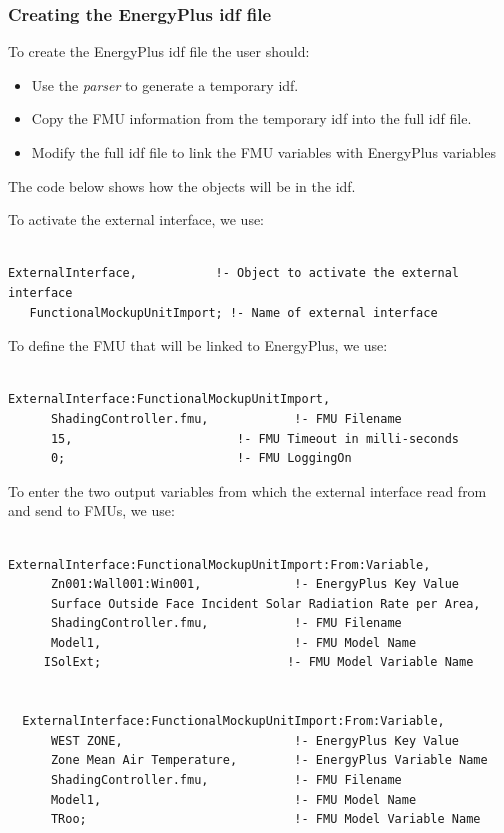 \subsubsection{Creating the EnergyPlus idf file}\label{creating-the-energyplus-idf-file-1-000}

To create the EnergyPlus idf file the user should:

\begin{itemize}
\item
  Use the \emph{parser} to generate a temporary idf.
\item
  Copy the FMU information from the temporary idf into the full idf file.
\item
  Modify the full idf file to link the FMU variables with EnergyPlus variables
\end{itemize}

The code below shows how the objects will be in the idf.

To activate the external interface, we use:

\begin{lstlisting}

ExternalInterface,           !- Object to activate the external interface
   FunctionalMockupUnitImport; !- Name of external interface
\end{lstlisting}

To define the FMU that will be linked to EnergyPlus, we use:

\begin{lstlisting}

ExternalInterface:FunctionalMockupUnitImport,
      ShadingController.fmu,            !- FMU Filename
      15,                       !- FMU Timeout in milli-seconds
      0;                        !- FMU LoggingOn
\end{lstlisting}

To enter the two output variables from which the external interface read from and send to FMUs, we use:

\begin{lstlisting}

ExternalInterface:FunctionalMockupUnitImport:From:Variable,
      Zn001:Wall001:Win001,             !- EnergyPlus Key Value
      Surface Outside Face Incident Solar Radiation Rate per Area,
      ShadingController.fmu,            !- FMU Filename
      Model1,                           !- FMU Model Name
     ISolExt;                          !- FMU Model Variable Name


  ExternalInterface:FunctionalMockupUnitImport:From:Variable,
      WEST ZONE,                        !- EnergyPlus Key Value
      Zone Mean Air Temperature,        !- EnergyPlus Variable Name
      ShadingController.fmu,            !- FMU Filename
      Model1,                           !- FMU Model Name
      TRoo;                             !- FMU Model Variable Name
\end{lstlisting}

